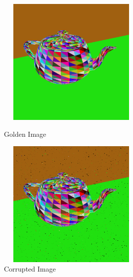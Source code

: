 \documentclass[12pt,a4paper]{article}
\begin{document}
\begin{figure}
  \begin{minipage}{0.45\textwidth}
  \centerline{\includegraphics[width=7.2cm,height=6.2cm]{image/teapot.png}}
  \caption{Golden Image}
  \label{fig:original}
  \end{minipage}
  \begin{minipage}{0.45\textwidth}
  \centerline{\includegraphics[width=7.2cm,height=6.2cm]{image/teapot-corrupt_fip_1_1000.png}}
  \caption{Corrupted Image}
  \label{fig:corrupted}
  \end{minipage} 
\end{figure}
  
% 
% 
% 
% 




\end{document}
